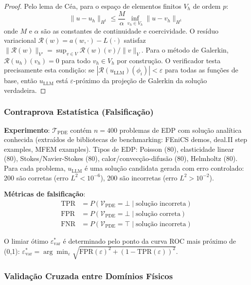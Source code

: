 \documentclass[5p]{elsarticle}
\theoremstyle{remark}
\begin{document}
\begin{proof}
Pelo lema de Céa, para o espaço de elementos finitos $V_h$ de ordem $p$:
\begin{equation}
\|u - u_h\|_{H^1} \leq \frac{M}{\alpha} \inf_{v_h \in V_h} \|u - v_h\|_{H^1}
\label{eq:c6_cea}
\end{equation}
onde $M$ e $\alpha$ são as constantes de continuidade e coercividade. O resíduo variacional $\mathcal{R}(w) = a(w, \cdot) - L(\cdot)$ satisfaz $\|\mathcal{R}(w)\|_{V'} = \sup_{v \in V} \mathcal{R}(w)(v)/\|v\|_V$. Para o método de Galerkin, $\mathcal{R}(u_h)(v_h) = 0$ para todo $v_h \in V_h$ por construção. O verificador testa precisamente esta condição: se $|\mathcal{R}(u_{\text{LLM}})(\phi_i)| < \varepsilon$ para todas as funções de base, então $u_{\text{LLM}}$ está $\varepsilon$-próximo da projeção de Galerkin da solução verdadeira.
\end{proof}

\subsubsection{Contraprova Estatística (Falsificação)}

\textbf{Experimento}: $\mathcal{T}_{\text{PDE}}$ contém $n = 400$ problemas de EDP com solução analítica conhecida (extraídos de bibliotecas de benchmarking: FEniCS demos, deal.II step examples, MFEM examples). Tipos de EDP: Poisson (80), elasticidade linear (80), Stokes/Navier-Stokes (80), calor/convecção-difusão (80), Helmholtz (80). Para cada problema, $u_{\text{LLM}}$ é uma solução candidata gerada com erro controlado: 200 são corretas (erro $L^2 < 10^{-6}$), 200 são incorretas (erro $L^2 > 10^{-2}$).

\textbf{Métricas de falsificação}:
\begin{align}
\text{TPR} &= P(\mathcal{V}_{\text{PDE}} = \bot \mid \text{solução incorreta}) \\
\text{FPR} &= P(\mathcal{V}_{\text{PDE}} = \bot \mid \text{solução correta}) \\
\text{FNR} &= P(\mathcal{V}_{\text{PDE}} = \top \mid \text{solução incorreta})
\end{align}

O limiar ótimo $\varepsilon_{\text{var}}^*$ é determinado pelo ponto da curva ROC mais próximo de (0,1): $\varepsilon_{\text{var}}^* = \arg\min_{\varepsilon} \sqrt{\text{FPR}(\varepsilon)^2 + (1 - \text{TPR}(\varepsilon))^2}$.

\subsubsection{Validação Cruzada entre Domínios Físicos}
\end{document}
